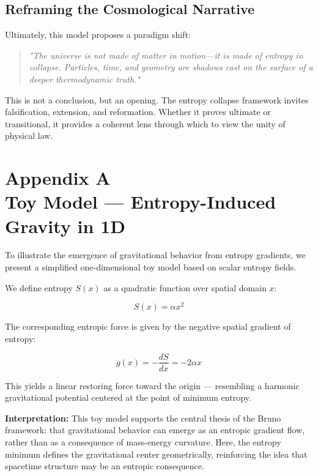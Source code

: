 \documentclass[12pt]{article}
\begin{document}
\clearpage
\subsection*{Reframing the Cosmological Narrative}

Ultimately, this model proposes a paradigm shift: 
\vspace{0.5em}

\begin{quote}
\emph{"The universe is not made of matter in motion—it is made of entropy in collapse. Particles, time, and geometry are shadows cast on the surface of a deeper thermodynamic truth."}
\end{quote}

This is not a conclusion, but an opening. The entropy collapse framework invites falsification, extension, and reformation. Whether it proves ultimate or transitional, it provides a coherent lens through which to view the unity of physical law.

\appendix

\clearpage
\section*{Appendix A \\ Toy Model — Entropy-Induced Gravity in 1D}

To illustrate the emergence of gravitational behavior from entropy gradients, we present a simplified one-dimensional toy model based on scalar entropy fields.

\FloatBarrier
We define entropy \( S(x) \) as a quadratic function over spatial domain \( x \):

\begin{equation}
S(x) = \alpha x^2
\end{equation}

The corresponding entropic force is given by the negative spatial gradient of entropy:

\begin{equation}
g(x) = -\frac{dS}{dx} = -2\alpha x
\end{equation}
\FloatBarrier

This yields a linear restoring force toward the origin — resembling a harmonic gravitational potential centered at the point of minimum entropy.

\vspace{0.5em}
\noindent
\textbf{Interpretation:} This toy model supports the central thesis of the Bruno framework: that gravitational behavior can emerge as an entropic gradient flow, rather than as a consequence of mass-energy curvature. Here, the entropy minimum defines the gravitational center geometrically, reinforcing the idea that spacetime structure may be an entropic consequence.
\end{document}
